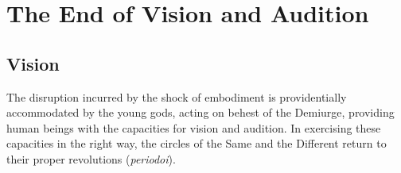 \chapter{The End of Vision and Audition} %
\label{cha:the_end_of_vision_and_audition}

\section{Vision} %
\label{sec:vision}

The disruption incurred by the shock of embodiment is providentially accommodated by the young gods, acting on behest of the Demiurge, providing human beings with the capacities for vision and audition. In exercising these capacities in the right way, the circles of the Same and the Different return to their proper revolutions (\emph{periodoi}). 

